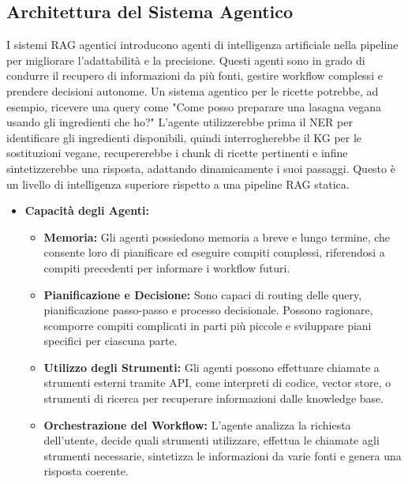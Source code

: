 \documentclass[a4paper, 11pt]{article}
\begin{document}
\subsection{Architettura del Sistema Agentico}
I sistemi RAG agentici introducono agenti di intelligenza artificiale nella pipeline per migliorare l'adattabilità e la precisione. \cite{what_is_agentic_rag_ibm} Questi agenti sono in grado di condurre il recupero di informazioni da più fonti, gestire workflow complessi e prendere decisioni autonome. Un sistema agentico per le ricette potrebbe, ad esempio, ricevere una query come "Come posso preparare una lasagna vegana usando gli ingredienti che ho?" L'agente utilizzerebbe prima il NER per identificare gli ingredienti disponibili, quindi interrogherebbe il KG per le sostituzioni vegane, recupererebbe i chunk di ricette pertinenti e infine sintetizzerebbe una risposta, adattando dinamicamente i suoi passaggi. Questo è un livello di intelligenza superiore rispetto a una pipeline RAG statica.
\begin{itemize}
    \item \textbf{Capacità degli Agenti:}
    \begin{itemize}
        \item \textbf{Memoria:} Gli agenti possiedono memoria a breve e lungo termine, che consente loro di pianificare ed eseguire compiti complessi, riferendosi a compiti precedenti per informare i workflow futuri. \cite{what_is_agentic_rag_ibm}
        \item \textbf{Pianificazione e Decisione:} Sono capaci di routing delle query, pianificazione passo-passo e processo decisionale. \cite{what_is_agentic_rag_ibm} Possono ragionare, scomporre compiti complicati in parti più piccole e sviluppare piani specifici per ciascuna parte. \cite{llm_agents_guide}
        \item \textbf{Utilizzo degli Strumenti:} Gli agenti possono effettuare chiamate a strumenti esterni tramite API, come interpreti di codice, vector store, o strumenti di ricerca per recuperare informazioni dalle knowledge base. \cite{what_is_agentic_rag_ibm}
        \item \textbf{Orchestrazione del Workflow:} L'agente analizza la richiesta dell'utente, decide quali strumenti utilizzare, effettua le chiamate agli strumenti necessarie, sintetizza le informazioni da varie fonti e genera una risposta coerente. \cite{agentic_rag_workflow}
    \end{itemize}
\end{itemize}
\end{document}

